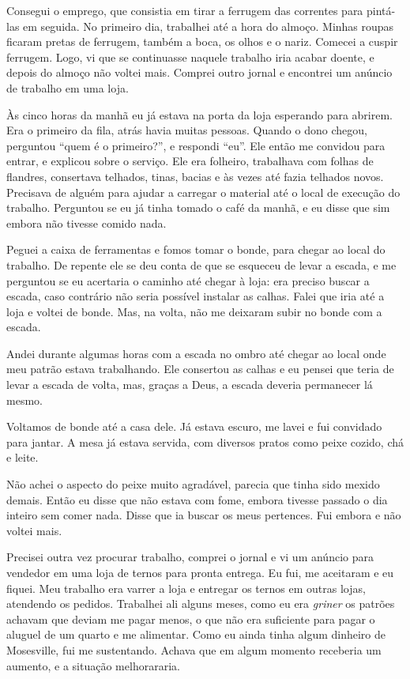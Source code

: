 Consegui o emprego, que consistia em tirar a ferrugem das
correntes para pintá-las em seguida. No primeiro dia, trabalhei até a hora
do almoço. Minhas roupas ficaram pretas de ferrugem, também a boca,
os olhos e o nariz. Comecei a cuspir ferrugem. Logo, vi que se
continuasse naquele trabalho iria acabar doente, e depois do
almoço não voltei mais. Comprei outro jornal e encontrei um anúncio de trabalho em uma loja.

Às cinco horas da manhã eu já estava na porta da loja esperando para abrirem. Era o primeiro da fila, atrás havia muitas pessoas. Quando o dono chegou, perguntou ``quem é o primeiro?'', e respondi ``eu''. Ele então me
convidou para entrar, e explicou sobre o serviço. Ele era folheiro, trabalhava com folhas de flandres, consertava
telhados, tinas, bacias e às vezes até fazia telhados novos. Precisava de
alguém para ajudar a carregar o material até o local de execução do trabalho. Perguntou se eu já tinha tomado o café da manhã, e eu disse que sim embora não tivesse comido nada.

Peguei a caixa de ferramentas e fomos tomar o bonde, para chegar ao 
local do trabalho. De repente ele se deu conta de que se esqueceu 
de levar a escada, e me perguntou se eu acertaria o caminho até 
chegar à loja: era preciso buscar a escada, caso contrário não 
seria possível instalar as calhas. Falei que iria até a loja e 
voltei de bonde. Mas, na volta, não me deixaram subir no bonde com a escada.

Andei durante algumas horas com a escada no ombro até chegar ao local
onde meu patrão estava trabalhando. Ele consertou as calhas e eu pensei
que teria de levar a escada de volta, mas, graças a Deus, a escada deveria
permanecer lá mesmo.

Voltamos de bonde até a casa dele. Já estava escuro, me lavei e fui
convidado para jantar. A mesa já estava servida, com diversos
pratos como peixe cozido, chá e leite.

Não achei o aspecto do peixe muito agradável, parecia que tinha sido 
mexido demais. Então eu disse que não estava com fome, embora tivesse
passado o dia inteiro sem comer nada. Disse que ia buscar os meus
pertences. Fui embora e não voltei mais.

Precisei outra vez procurar trabalho, comprei o jornal e vi um anúncio para vendedor em uma loja de ternos para pronta entrega. Eu fui, me aceitaram e eu fiquei. Meu trabalho era varrer a loja e
entregar os ternos em outras lojas, atendendo os pedidos.
Trabalhei ali alguns meses, como eu era \textit{griner} os patrões achavam
que deviam me pagar menos, o que não era suficiente para pagar o aluguel
de um quarto e me alimentar. Como eu ainda tinha algum dinheiro de
Mosesville, fui me sustentando. Achava que em algum momento receberia um aumento, e
a situação melhorararia.


